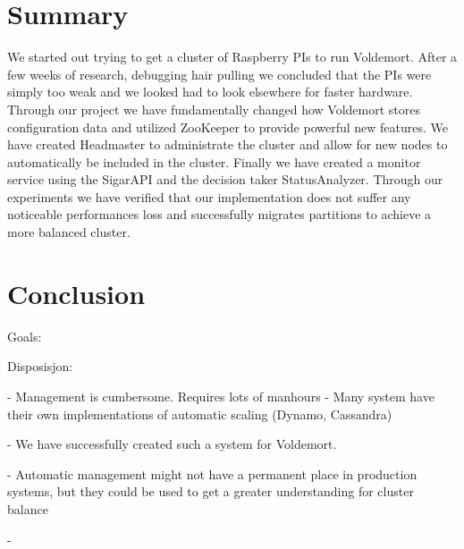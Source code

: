 \section{Summary}
We started out trying to get a cluster of Raspberry PIs to run Voldemort. After a few weeks of research, debugging hair pulling we concluded that the PIs were simply too weak and we looked had to look elsewhere for faster hardware. Through our project we have fundamentally changed how Voldemort stores configuration data and utilized ZooKeeper to provide powerful new features. We have created Headmaster to administrate the cluster and allow for new nodes to automatically be included in the cluster. Finally we have created a monitor service using the SigarAPI and the decision taker StatusAnalyzer. Through our experiments we have verified that our implementation does not suffer any noticeable performances loss and successfully migrates partitions to achieve a more balanced cluster. 





\section{Conclusion}

Goals: 

Disposisjon:
	
	- Management is cumbersome. Requires lots of manhours
	- Many system have their own implementations of automatic scaling (Dynamo, Cassandra)

	- We have successfully created such a system for Voldemort. 

	- Automatic management might not have a permanent place in production systems, but they could be used to get a greater understanding for cluster balance

	- 




